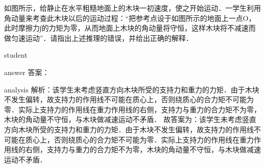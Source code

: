 \begin{example}
	如图所示，给静止在水平粗糙地面上的木块一初速度，使之开始运动．一学生利用角动量来考查此木块以后的运动过程：“把参考点设于如图所示的地面上一点O，此时摩擦力∫的力矩为零，从而地面上木块的角动量将守恒，这样木块将不减速而做匀速运动”．请指出上述推理的错误，并给出正确的解释．
	
	\begin{taggedblock}{student}
		\vspace*{1cm}
	\end{taggedblock}
	
	
	\begin{taggedblock}{answer}
		答案：
	\end{taggedblock}
	
	
	\begin{taggedblock}{analysis}
		解析：该学生未考虑竖直方向木块所受的支持力和重力的力矩．由于木块不发生偏转，故支持力的作用线不可能在质心上，否则绕质心的合力矩不可能为零．实际上支持力的作用线在重力作用线的右侧，支持力与重力的合力矩不为零，木块的角动量不守恒，与木块做减速运动不矛盾．
		故答案为：该学生未考虑竖直方向木块所受的支持力和重力的力矩．由于木块不发生偏转，故支持力的作用线不可能在质心上，否则绕质心的合力矩不可能为零．实际上支持力的作用线在重力作用线的右侧，支持力与重力的合力矩不为零，木块的角动量不守恒，与木块做减速运动不矛盾．
		
	\end{taggedblock}
\end{example}